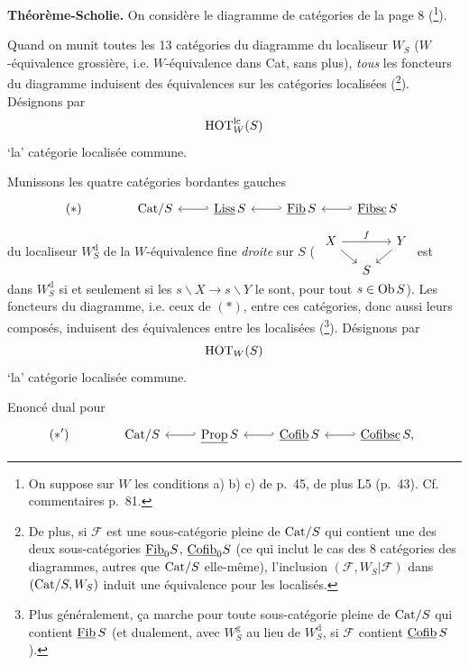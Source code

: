 \textbf{Théorème-Scholie.} On considère le diagramme de catégories de la page 8 (\footnote[43]{On suppose sur $W$ les conditions a) b) c) de p.~45, de plus L5 (p.~43). Cf. commentaires p.~81.}).

 Quand on munit toutes les 13 catégories du diagramme du localiseur $W_S$ ($W$-équivalence grossière, i.e. $W$-équivalence dans Cat, sans plus), \textit{tous} les foncteurs du diagramme induisent des équivalences sur les catégories localisées (\footnote[44]{De plus, si $\mathcal{F}$ est une sous-catégorie pleine de $\mathrm{Cat}/S$ qui contient une des deux sous-catégories $\underline{\mathrm{Fib}}_0S$, $\underline{\mathrm{Cofib}}_0S$ (ce qui inclut le cas des 8 catégories des diagrammes, autres que $\mathrm{Cat}/S$ elle-même), l'inclusion $(\mathcal{F},W_S|\mathcal{F})$ dans $(\mathrm{Cat}/S,W_S)$ induit une équivalence pour les localisés.}). Désignons par
\[
\mathrm{HOT}^{\mathrm{lc}}_W(S)
\]
‘la’ catégorie localisée commune.

 Munissons les quatre catégories bordantes gauches
\[
(*)\qquad\qquad
\begin{tikzcd}
\Cat/S & \ul{Liss}\,S \arrow[l, hook'] & \ul{Fib}\,S \arrow[l, hook'] & \ul{Fibsc}\,S \arrow[l, hook']
\end{tikzcd}
\]
du localiseur $W_S^{\mathrm{d}}$ de la $W$-équivalence fine \textit{droite} sur $S$ ( $\begin{tikzcd}[row sep=small, column sep=small]
X \arrow[rr, "f"] \arrow[dr] & & Y \arrow[dl]\\
 & S &
\end{tikzcd}$ est dans $W_S^{\mathrm{d}}$ si et seulement si les $s\backslash X\longrightarrow s\backslash Y$ le sont, pour tout $s\in\mathrm{Ob}\,S$). Les foncteurs du diagramme, i.e. ceux de $(*)$, entre ces catégories, donc aussi leurs composés, induisent des équivalences entre les localisées (\footnote[45]{Plus généralement, ça marche pour toute sous-catégorie pleine de $\mathrm{Cat}/S$ qui contient $\underline{\mathrm{Fib}}\,S$ (et dualement, avec $W_S^{\mathrm{g}}$ au lieu de $W_S^{\mathrm{d}}$, si $\mathcal{F}$ contient $\underline{\mathrm{Cofib}}\,S$).}). Désignons par
\[
\mathrm{HOT}_W(S)
\]
‘la’ catégorie localisée commune.

Enoncé dual pour
\[
(*')\qquad\qquad
\begin{tikzcd}
\Cat/S & \ul{Prop}\,S \arrow[l, hook'] & \ul{Cofib}\,S \arrow[l, hook'] & \ul{Cofibsc}\,S, \arrow[l, hook']
\end{tikzcd}
\]



